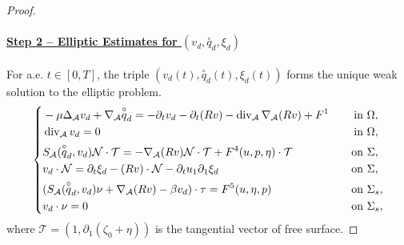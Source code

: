 \documentclass[letterpaper,reqno,10pt,twoside]{amsart}
\theoremstyle{definition}
\theoremstyle{remark}
\def\p{\partial}
\def\Om{\Omega}
\def\dive{\mathop{\rm div}\nolimits}
\begin{document}
\begin{proof}
		\paragraph{\underline{Step 2 -- Elliptic Estimates for $(v_d,\overset{\circ}q_{d},\xi_d)$}}
		For a.e. $t\in[0,T]$, the triple $(v_{d}(t),\overset{\circ}q_{d}(t),\xi_{d}(t))$ forms the unique weak solution to the elliptic problem.
		\begin{equation}{\label{eq:e-1}}
			\left\{
			\begin{aligned}
				&-\mu \Delta_{\mathcal{A}} v_{d} + \nabla_{\mathcal{A}} \overset{\circ}q_{d} = -\p_t v_{d}-\p_{t}(Rv)-\operatorname{div}_{\mathcal{A}}\nabla_{\mathcal{A}}(Rv) + F^1 \quad &\text{in}& \ \Om,\\
				& \dive_{\mathcal{A}} v_{d} =0 \quad &\text{in}& \ \Om,\\
				& S_{\mathcal{A}}(\overset{\circ}q_{d},v_{d})\mathcal{N}\cdot \mathcal{T}=-\nabla_{\mathcal{A}}(Rv)\mathcal{N}\cdot \mathcal{T}+F^{4}(u,p,\eta)\cdot \mathcal{T} \quad &\text{on}&~  \Sigma,\\
				& v_{d}\cdot \mathcal{N} = \p_t\xi_{d}-(Rv)\cdot \mathcal{N}-\p_{t}u_{1}\p_{1}\xi_{d} \quad &\text{on}& \ \Sigma,\\
				&(S_{\mathcal{A}}(\overset{\circ}q_{d},v_{d})\nu+\nabla_{\mathcal{A}}(Rv)-\beta v_{d})\cdot \tau=F^{5}(u,\eta,p) \quad &\text{on}& \ \Sigma_s,\\
				& v_{d} \cdot \nu =0 \quad &\text{on}& \ \Sigma_s,
			\end{aligned}
			\right.
		\end{equation}
		where $\mathcal{T} = (1, \p_1(\zeta_0 + \eta))$ is the tangential vector of free surface.
		

\end{proof}
\end{document}
